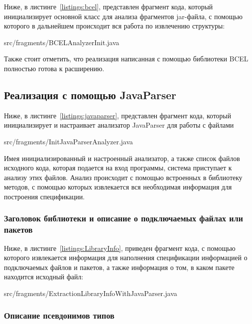 Ниже, в листинге~\ref{listings:bcel}, представлен фрагмент кода, который инициализирует основной класс для анализа фрагментов jar-файла, с помощью которого в дальнейшем происходит вся работа по извлечению структуры:

{src/fragments/BCELAnalyzerInit.java}

Также стоит отметить, что реализация написанная с помощью библиотеки BCEL полностью готова к расширению.

\subsection{Реализация с помощью JavaParser}

Ниже, в листинге~\ref{listings:javaparser}, представлен фрагмент кода, который инициализирует и настраивает анализатор JavaParser для работы с файлами

{src/fragments/InitJavaParserAnalyzer.java}

Имея инициализированный и настроенный анализатор, а также список файлов исходного кода, которая подается на вход программы, система приступает к анализу этих файлов.
Анализ происходит с помощью встроенных в библиотеку методов, с помощью которых извлекается вся необходимая информация для построения спецификации.

\subsubsection{Заголовок библиотеки и описание о подключаемых файлах или пакетов}

Ниже, в листинге~\ref{listings:LibraryInfo}, приведен фрагмент кода, с помощью которого извлекается информация для наполнения спецификации информацией о подключаемых файлов и пакетов, а также информация о том, в каком пакете находится исходный файл:

{src/fragments/ExtractionLibraryInfoWithJavaParser.java}

\subsubsection{Описание псевдонимов типов}

